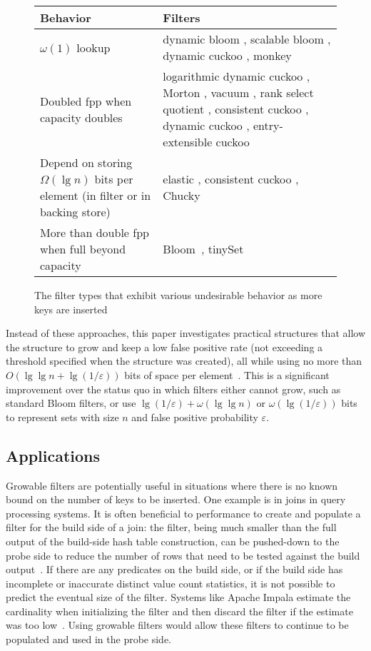 \documentclass[letterpaper,twocolumn,10pt]{article}
\begin{document}
\begin{figure*}
\begin{tabular}{|m{2in}|m{4.667in}|}
\hline {\bf Behavior} & {\bf Filters} \\
\hline $\omega(1)$ lookup & dynamic bloom \cite{dynamic-bloom}, scalable bloom \cite{scalable-bloom}, dynamic cuckoo \cite{dynamic-cuckoo}, monkey \cite{monkey}\\
\hline Doubled fpp when capacity doubles & logarithmic dynamic cuckoo \cite{logarithm}, Morton \cite{morton-journal}, vacuum \cite{vacuum}, rank select quotient \cite{rsqf}, consistent cuckoo \cite{consistent-cuckoo}, dynamic cuckoo \cite{dynamic-cuckoo}, entry-extensible cuckoo \cite{entry-extensible} \\
\hline Depend on storing $\Omega(\lg n)$ bits per element (in filter or in backing store) & elastic \cite{elastic}, consistent cuckoo \cite{consistent-cuckoo}, Chucky \cite{chucky} \\
\hline More than double fpp when full beyond capacity & Bloom~\cite{bloom}, tinySet~\cite{tinyset} \\
\hline
\end{tabular}
\caption{The filter types that exhibit various undesirable behavior as more keys are inserted
\label{prior-work-table}}
\end{figure*}

Instead of these approaches, this paper investigates practical structures that allow the structure to grow and keep a low false positive rate (not exceeding a threshold specified when the structure was created), all while using no more than $O(\lg \lg n + \lg (1/\varepsilon))$ bits of space per element~\cite{psw}.
This is a significant improvement over the status quo in which filters either cannot grow, such as standard Bloom filters, or use $\lg (1 / \varepsilon) + \omega(\lg \lg n)$ or $\omega(\lg(1/\varepsilon))$ bits to represent sets with size $n$ and false positive probability $\varepsilon$.

\subsection{Applications}

Growable filters are potentially useful in situations where there is no known bound on the number of keys to be inserted.
One example is in joins in query processing systems.
It is often beneficial to performance to create and populate a filter for the build side of a join:
the filter, being much smaller than the full output of the build-side hash table construction, can be pushed-down to the probe side to reduce the number of rows that need to be tested against the build output~\cite{tpch-filter}.
If there are any predicates on the build side, or if the build side has incomplete or inaccurate distinct value count statistics, it is not possible to predict the eventual size of the filter.
Systems like Apache Impala estimate the cardinality when initializing the filter and then discard the filter if the estimate was too low~\cite{impala}.
Using growable filters would allow these filters to continue to be populated and used in the probe side.
\end{document}
